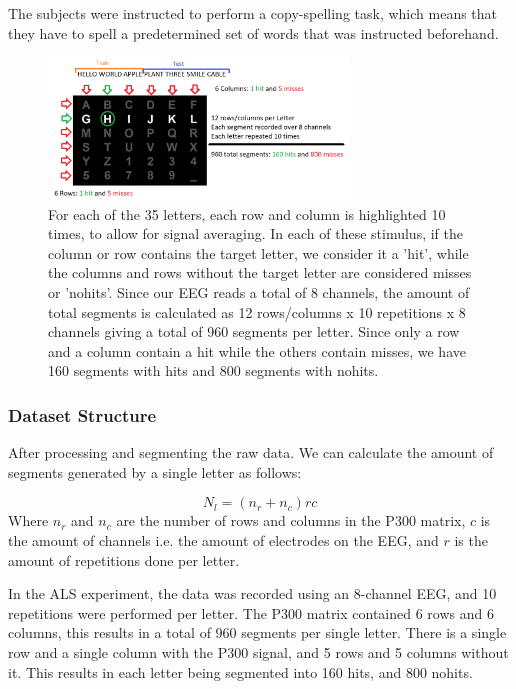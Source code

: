 \documentclass[conference]{IEEEtran}
\begin{document}
The subjects were instructed to perform a copy-spelling task, which means that they have to spell a predetermined set of words that was instructed beforehand.


\begin{figure}[htbp]
\centerline{\includegraphics[width=8cm, keepaspectratio]{images/experiment.png}}
\caption[Experimental protocol visualization]{For each of the 35 letters, each row and column is highlighted 10 times, to allow for signal averaging. In each of these stimulus, if the column or row contains the target letter, we consider it a 'hit', while the columns and rows without the target letter are considered misses or 'nohits'. Since our EEG reads a total of 8 channels, the amount of total segments is calculated as 12 rows/columns x 10 repetitions x 8 channels  giving a total of 960 segments per letter. Since only a row and a column contain a hit while the others contain misses, we have 160 segments with hits and 800 segments with nohits.}
\label{fig:datastructure}
\end{figure}


\subsubsection{Dataset Structure}

After processing and segmenting the raw data. We can calculate the amount of segments generated by a single letter as follows:

\begin{equation}
N_l = (n_r + n_c)rc
\end{equation}
Where $n_r$ and $n_c$ are the number of rows and columns in the P300 matrix, $c$ is the amount of channels i.e. the amount of electrodes on the EEG, and $r$ is the amount of repetitions done per letter.

In the ALS experiment, the data was recorded using an 8-channel EEG, and 10 repetitions were performed per letter. The P300 matrix contained 6 rows and 6 columns, this results in a total of 960 segments per single letter. There is a single row and a single column with the P300 signal, and 5 rows and 5 columns without it. This results in each letter being segmented into 160 hits, and 800 nohits.
\end{document}
